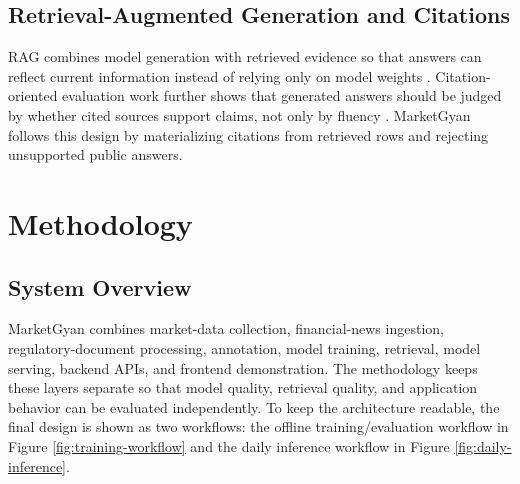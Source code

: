 \documentclass[12pt,a4paper]{report}
\begin{document}
\section{Retrieval-Augmented Generation and Citations}
RAG combines model generation with retrieved evidence so that answers can reflect current information instead of relying only on model weights \cite{lewis2020rag}. Citation-oriented evaluation work further shows that generated answers should be judged by whether cited sources support claims, not only by fluency \cite{gao2023alce,zhang2024longcite}. MarketGyan follows this design by materializing citations from retrieved rows and rejecting unsupported public answers.

\chapter{Methodology}

\section{System Overview}
MarketGyan combines market-data collection, financial-news ingestion, regulatory-document processing, annotation, model training, retrieval, model serving, backend APIs, and frontend demonstration. The methodology keeps these layers separate so that model quality, retrieval quality, and application behavior can be evaluated independently. To keep the architecture readable, the final design is shown as two workflows: the offline training/evaluation workflow in Figure \ref{fig:training-workflow} and the daily inference workflow in Figure \ref{fig:daily-inference}.
\end{document}
